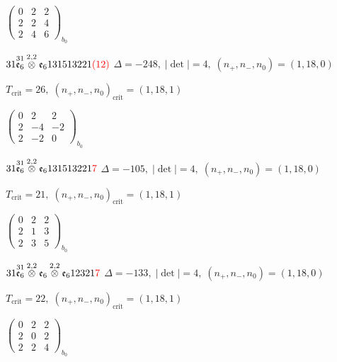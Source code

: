 \documentclass[10pt]{article}
\begin{document}
\hspace{2em}$\left(\begin{smallmatrix}0 & 2 & 2 \\ 2 & 2 & 4 \\ 2 & 4 & 6\end{smallmatrix}\right)_{\!b_0}$

$31\overset{31}{\mathfrak{e}_6}\overset{2,2}{\otimes}\mathfrak{e}_6131513221\textcolor{red}{(12)}$ \quad $\Delta=-248,\; |\det|=4,\; (n_+,n_-,n_0)=(1,18,0)$

\hspace{1em}$T_{\text{crit}}=26,\; (n_+,n_-,n_0)_{\text{crit}}=(1,18,1)$

\hspace{2em}$\left(\begin{smallmatrix}0 & 2 & 2 \\ 2 & -4 & -2 \\ 2 & -2 & 0\end{smallmatrix}\right)_{\!b_0}$

$31\overset{31}{\mathfrak{e}_6}\overset{2,2}{\otimes}\mathfrak{e}_6131513221\textcolor{red}{7}$ \quad $\Delta=-105,\; |\det|=4,\; (n_+,n_-,n_0)=(1,18,0)$

\hspace{1em}$T_{\text{crit}}=21,\; (n_+,n_-,n_0)_{\text{crit}}=(1,18,1)$

\hspace{2em}$\left(\begin{smallmatrix}0 & 2 & 2 \\ 2 & 1 & 3 \\ 2 & 3 & 5\end{smallmatrix}\right)_{\!b_0}$

\smallskip

$31\overset{31}{\mathfrak{e}_6}\overset{2,2}{\otimes}\mathfrak{e}_6\overset{2,2}{\otimes}\mathfrak{e}_612321\textcolor{red}{7}$ \quad $\Delta=-133,\; |\det|=4,\; (n_+,n_-,n_0)=(1,18,0)$

\hspace{1em}$T_{\text{crit}}=22,\; (n_+,n_-,n_0)_{\text{crit}}=(1,18,1)$

\hspace{2em}$\left(\begin{smallmatrix}0 & 2 & 2 \\ 2 & 0 & 2 \\ 2 & 2 & 4\end{smallmatrix}\right)_{\!b_0}$
\end{document}
